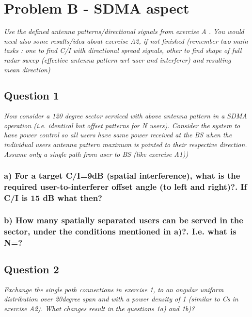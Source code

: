 \section{Problem B - SDMA aspect}
\textit{Use the defined antenna patterns/directional signals from exercise A . You would need also some results/idea about exercise A2, if not finished (remember two main tasks : one to find C/I with directional spread signals, other to find shape of full radar sweep (effective antenna pattern wrt user and interferer) and resulting mean direction)}

\subsection{Question 1}
\textit{Now consider a 120 degree sector serviced with above antenna pattern in a SDMA operation (i.e. identical but offset patterns for N users). Consider the system to have power control so all users have same power received at the BS when the individual users antenna pattern maximum is pointed to their respective direction. Assume only a single path from user to BS (like exercise A1))}

\subsubsection{a) For a target C/I=9dB (spatial interference), what is the required user-to-interferer offset angle (to left and right)?. If C/I is 15 dB what then?}


\subsubsection{b) How many spatially separated users can be served in the sector, under the conditions mentioned in a)?. I.e. what is N=?}


\subsection{Question 2}
\textit{Exchange the single path connections in exercise 1, to an angular uniform distribution over 20degree span and with a power density of 1 (similar to Cs in exercise A2). What changes result in the questions 1a) and 1b)?}

